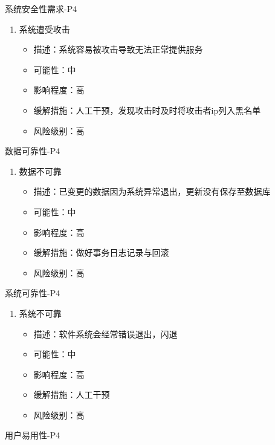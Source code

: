 \documentclass[hyperref, a4paper]{ctexart}
\providecommand{\tightlist}{%
  \setlength{\itemsep}{0pt}\setlength{\parskip}{0pt}}
\begin{document}
系统安全性需求-P4

\begin{enumerate}
\def\labelenumi{\arabic{enumi}.}
\tightlist
\item
  系统遭受攻击

  \begin{itemize}
  \tightlist
  \item
    描述：系统容易被攻击导致无法正常提供服务
  \item
    可能性：中
  \item
    影响程度：高
  \item
    缓解措施：人工干预，发现攻击时及时将攻击者ip列入黑名单
  \item
    风险级别：高
  \end{itemize}
\end{enumerate}

数据可靠性-P4

\begin{enumerate}
\def\labelenumi{\arabic{enumi}.}
\tightlist
\item
  数据不可靠

  \begin{itemize}
  \tightlist
  \item
    描述：已变更的数据因为系统异常退出，更新没有保存至数据库
  \item
    可能性：中
  \item
    影响程度：高
  \item
    缓解措施：做好事务日志记录与回滚
  \item
    风险级别：高
  \end{itemize}
\end{enumerate}

系统可靠性-P4

\begin{enumerate}
\def\labelenumi{\arabic{enumi}.}
\tightlist
\item
  系统不可靠

  \begin{itemize}
  \tightlist
  \item
    描述：软件系统会经常错误退出，闪退
  \item
    可能性：中
  \item
    影响程度：高
  \item
    缓解措施：人工干预
  \item
    风险级别：高
  \end{itemize}
\end{enumerate}

用户易用性-P4
\end{document}
